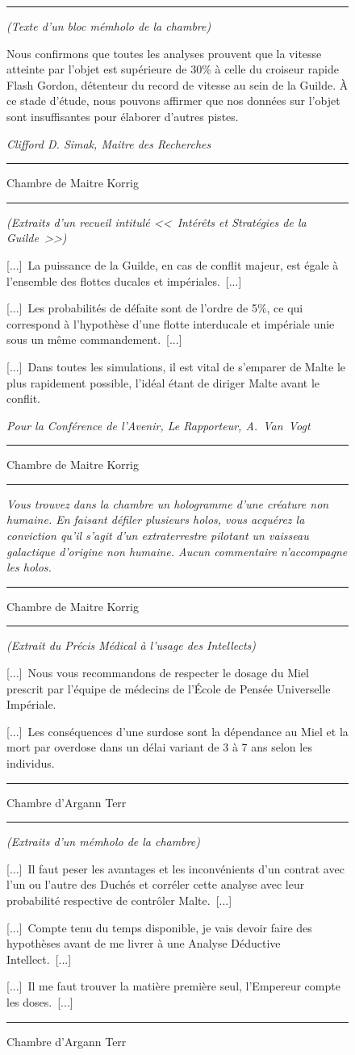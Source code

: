\documentclass{article}
\newcommand{\newcharacter}{\clearpage\setcounter{figure}{0}}
\newcommand{\indice}[4]{
  \begin{figure}[H]
    \begin{center}
      \rule{0.5\textwidth}{1pt}
    \end{center}
    \begin{framed}
      \begin{samepage}
        \textit{#1}
        \nopagebreak

        #2

        \nopagebreak

        \hfill\textit{#3}
      \end{samepage}
    \end{framed}
    \caption{#4}
    \begin{center}
      \rule{0.5\textwidth}{1pt}
    \end{center}
  \end{figure}
}
\begin{document}
\newcharacter

\indice
{(Texte d'un bloc mémholo de la chambre)}
{Nous confirmons que toutes les analyses prouvent que la vitesse atteinte par
l'objet est supérieure de 30\% à celle du croiseur rapide Flash Gordon,
détenteur du record de vitesse au sein de la Guilde. À ce stade d'étude, nous
pouvons affirmer que nos données sur l'objet sont insuffisantes pour élaborer
d'autres pistes.}
{Clifford D. Simak, Maitre des Recherches}
{Chambre de Maitre Korrig}

\indice
{(Extraits d'un recueil intitulé <<~Intérêts et Stratégies de la Guilde~>>)}
{[...]~La puissance de la Guilde, en cas de conflit majeur, est égale à
l'ensemble des flottes ducales et impériales.~[...]

\nobreak

[...]~Les probabilités de défaite sont de l'ordre de 5\%, ce qui correspond à
l'hypothèse d'une flotte interducale et impériale unie sous un même
commandement.~[...]

\nobreak

[...]~Dans toutes les simulations, il est vital de s'emparer de Malte le plus
rapidement possible, l'idéal étant de diriger Malte avant le conflit.}
{Pour la Conférence de l'Avenir, Le Rapporteur, A.~Van~Vogt}
{Chambre de Maitre Korrig}

\indice
{Vous trouvez dans la chambre un hologramme d'une créature non humaine. En
faisant défiler plusieurs holos, vous acquérez la conviction qu'il s'agit d'un
extraterrestre pilotant un vaisseau galactique d'origine non humaine. Aucun
commentaire n'accompagne les holos.}
{}
{}
{Chambre de Maitre Korrig}

\newcharacter

\indice
{(Extrait du Précis Médical à l'usage des Intellects)}
{[...]~Nous vous recommandons de respecter le dosage du Miel prescrit par
l'équipe de médecins de l'École de Pensée Universelle Impériale.

\nobreak

[...]~Les conséquences d'une surdose sont la dépendance au Miel et la mort par
overdose dans un délai variant de 3 à 7 ans selon les individus.}
{}
{Chambre d'Argann Terr}

\indice
{(Extraits d'un mémholo de la chambre)}
{[...]~Il faut peser les avantages et les inconvénients d'un contrat avec l'un
ou l'autre des Duchés et corréler cette analyse avec leur probabilité
respective de contrôler Malte.~[...]

\nobreak

[...]~Compte tenu du temps disponible, je vais devoir faire des hypothèses
avant de me livrer à une Analyse Déductive Intellect.~[...]

\nobreak

[...]~Il me faut trouver la matière première seul, l'Empereur compte les
doses.~[...]}
{}
{Chambre d'Argann Terr}
\end{document}
